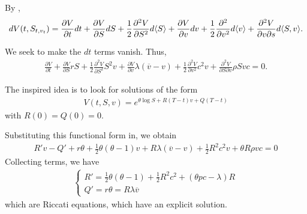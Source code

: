 By \ito,
\begin{align}
  \label{eq:126}
  dV(t, S_{t, v_{t}}) = \frac{\partial V}{\partial t} dt +
  \frac{\partial V}{\partial S} dS + \frac{1}{2} \frac{\partial^{2}
    V}{\partial S^{2}} d \IP{S} + \frac{\partial V}{\partial v} dv +
  \frac{1}{2} \frac{\partial^{2}}{\partial v^{2}} d \IP{v} +
  \frac{\partial^{2} V}{\partial v \partial s} d \IP{S, v}.
\end{align}

We seek to make the $dt$ terms vanish.  Thus,
\begin{align}
  \label{eq:127}
  \frac{\partial V}{\partial t} + \frac{\partial V}{\partial S} rS +
  \frac{1}{2} \frac{\partial^{2} V}{\partial S^{2}} S^{2} v +
  \frac{\partial V}{\partial v} \lambda (\overline v - v) +
  \frac{1}{2} \frac{\partial^{2} V}{\partial v^{2}} c^{2} v +
  \frac{\partial^{2} V}{\partial S \partial v} \rho S v c = 0.
\end{align}

The inspired idea is to look for solutions of the form
\begin{align}
  \label{eq:128}
  V(t, S, v) = e^{\theta \log S + R(T-t)v + Q(T-t)}
\end{align} with $R(0) = Q(0) = 0$.

Substituting this functional form in, we obtain 
\begin{align}
  \label{eq:129}
  R'v - Q' + r \theta + \frac{1}{2} \theta (\theta - 1) v + R \lambda
  (\overline v - v) + \frac{1}{2} R^{2} c^{2} v + \theta R \rho v c =
  0
\end{align}  Collecting terms, we have
\begin{align}
  \label{eq:130}
  \begin{cases}
    R' = \frac{1}{2} \theta (\theta - 1) + \frac{1}{2} R^{2} c^{2} +
    (\theta p c - \lambda) R \\
    Q' = r \theta = R \lambda \overline v
  \end{cases}
\end{align} which are Riccati equations, which have an explicit solution.






